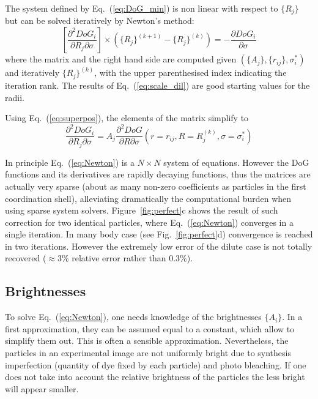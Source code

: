 \documentclass[8.5pt,twoside,twocolumn]{article}
\begin{document}
The system defined by Eq.~(\ref{eq:DoG_min}) is non linear with respect to $\lbrace R_j\rbrace$ but can be solved iteratively by Newton's method:
\begin{equation}
\left[ \frac{\partial^2 DoG_i}{\partial R_j\partial\sigma}\right] \times \left( \lbrace R_j\rbrace^{(k+1)} - \lbrace R_j\rbrace^{(k)} \right) = -\frac{\partial DoG_i}{\partial\sigma}
\label{eq:Newton}
\end{equation}
where the matrix and the right hand side are computed given $(\lbrace A_j\rbrace, \lbrace r_{ij}\rbrace, \sigma_i^*)$ and iteratively $\lbrace R_j\rbrace^{(k)}$, with the upper parenthesised index indicating the iteration rank. The results of Eq.~(\ref{eq:scale_dil}) are good starting values for the radii.

Using Eq.~(\ref{eq:superpos}), the elements of the matrix simplify to
\begin{equation}
\frac{\partial^2 DoG_i}{\partial R_j\partial\sigma} =  A_j \frac{\partial^2 DoG}{\partial R\partial\sigma}(r=r_{ij}, R=R_j^{(k)}, \sigma=\sigma_i^*)
\end{equation}

In principle Eq.~(\ref{eq:Newton}) is a $N\times N$ system of equations. However the DoG functions and its derivatives are rapidly decaying functions, thus the matrices are actually very sparse (about as many non-zero coefficients as particles in the first coordination shell), alleviating dramatically the computational burden when using sparse system solvers. Figure~\ref{fig:perfect}c shows the result of such correction for two identical particles, where Eq.~(\ref{eq:Newton}) converges in a single iteration. In many body case (see Fig.~\ref{fig:perfect}d) convergence is reached in two iterations. However the extremely low error of the dilute case is not totally recovered ($\approx 3\%$ relative error rather than $0.3\%$).

\subsection{Brightnesses}

To solve Eq.~(\ref{eq:Newton}), one needs knowledge of the brightnesses $\lbrace A_i\rbrace$. In a first approximation, they can be assumed equal to a constant, which allow to simplify them out. This is often a sensible approximation. Nevertheless, the particles in an experimental image are not uniformly bright due to synthesis imperfection (quantity of dye fixed by each particle) and photo bleaching. If one does not take into account the relative brightness of the particles the less bright will appear smaller.
\end{document}
